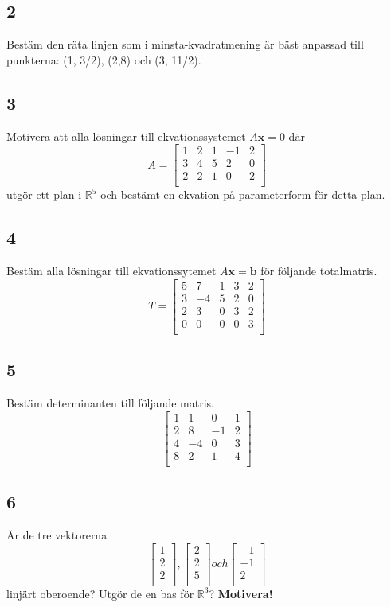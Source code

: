 \documentclass{article}
\begin{document}
\subsection*{2}
Bestäm den räta linjen som i minsta-kvadratmening är bäst anpassad till punkterna: (1, 3/2), (2,8) och (3, 11/2).

\subsection*{3}
Motivera att alla lösningar till ekvationssystemet $A \mathbf{x} = 0$ där 
$$ A = 
\begin{bmatrix}
    1  &  2  &  1  & -1  &  2 \\
    3  &  4  &  5  &  2  &  0 \\
    2  &  2  &  1  &  0  &  2 \\
\end{bmatrix}
$$
utgör ett plan i $\mathbb{R}^5$ och bestämt en ekvation på parameterform för 
detta plan.

\subsection*{4}
Bestäm alla lösningar till ekvationssytemet $A \mathbf{x}= \mathbf{b}$ för 
följande totalmatris.
$$ T = 
\begin{bmatrix}
    5  &  7  &  1  &  3  &  2 \\
    3  & -4  &  5  &  2  &  0 \\
    2  &  3  &  0  &  3  &  2 \\
    0  &  0  &  0  &  0  &  3 \\
\end{bmatrix}
$$

\subsection*{5}
Bestäm determinanten till följande matris.
$$
\begin{bmatrix}
    1  & 1   &  0   &  1 \\
    2  & 8   &  -1  &  2  \\
    4  & -4  &  0   &  3   \\
    8  &  2  &  1   &  4   \\
\end{bmatrix}
$$


\subsection*{6}
Är de tre vektorerna
$$
\begin{bmatrix}
    1 \\
    2 \\
    2 \\
\end{bmatrix}
,
\begin{bmatrix}
    2 \\
    2 \\
    5 \\
\end{bmatrix}
och
\begin{bmatrix}
    -1 \\
    -1 \\
     2 \\
\end{bmatrix}
$$
linjärt oberoende? Utgör de en bas för $\mathbb{R}^3$? {\bf Motivera!}
\end{document}
